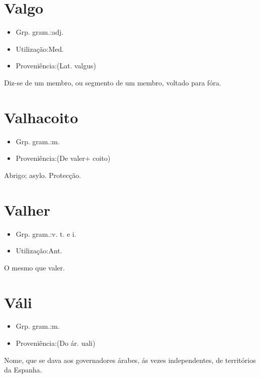 \documentclass{article}
\begin{document}
\section{Valgo}
\begin{itemize}
\item {Grp. gram.:adj.}
\end{itemize}
\begin{itemize}
\item {Utilização:Med.}
\end{itemize}
\begin{itemize}
\item {Proveniência:(Lat. \textunderscore valgus\textunderscore )}
\end{itemize}
Diz-se de um membro, ou segmento de um membro, voltado para fóra.
\section{Valhacoito}
\begin{itemize}
\item {Grp. gram.:m.}
\end{itemize}
\begin{itemize}
\item {Proveniência:(De \textunderscore valer\textunderscore  + \textunderscore coito\textunderscore )}
\end{itemize}
Abrigo; asylo.
Protecção.
\section{Valher}
\begin{itemize}
\item {Grp. gram.:v. t.  e  i.}
\end{itemize}
\begin{itemize}
\item {Utilização:Ant.}
\end{itemize}
O mesmo que \textunderscore valer\textunderscore .
\section{Váli}
\begin{itemize}
\item {Grp. gram.:m.}
\end{itemize}
\begin{itemize}
\item {Proveniência:(Do ár. \textunderscore uali\textunderscore )}
\end{itemize}
Nome, que se dava aos governadores árabes, ás vezes independentes, de territórios da Espanha.
\end{document}
